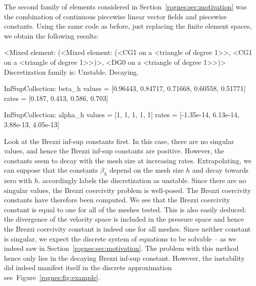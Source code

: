 The second family of elements considered in
Section~\ref{rognes:sec:motivation} was the combination of continuous
piecewise linear vector fields and piecewise constants. Using the same
code as before, just replacing the finite element spaces, we obtain
the following results:
\begin{python}
<Mixed element: (<Mixed element: (<CG1 on a <triangle of degree 1>>,
<CG1 on a <triangle of degree 1>>)>, <DG0 on a <triangle of degree 1>>)>
Discretization family is: Unstable. Decaying.

InfSupCollection: beta_h
values =         [0.96443, 0.84717, 0.71668, 0.60558, 0.51771]
rates  =         [0.187, 0.413, 0.586, 0.703]

InfSupCollection: alpha_h
values =         [1, 1, 1, 1, 1]
rates  =         [-1.35e-14, 6.13e-14, 3.88e-13, 4.05e-13]
\end{python}
Look at the Brezzi inf-sup constants first. In this case, there are no
singular values, and hence the Brezzi inf-sup constants are
positive. However, the constants seem to decay with the mesh size at
increasing rates. Extrapolating, we can suppose that the constants
$\beta_h$ depend on the mesh size $h$ and decay towards zero with
$h$. \rognesascot{} accordingly labels the discretization as
unstable. Since there are no singular values, the Brezzi coercivity
problem is well-posed. The Brezzi coercivity constants have therefore
been computed. We see that the Brezzi coercivity constant is equal to
one for all of the meshes tested. This is also easily deduced: the
divergence of the velocity space is included in the pressure space and
hence the Brezzi coercivity constant is indeed one for all
meshes. Since neither constant is singular, we expect the discrete
system of equations to be solvable -- as we indeed saw in
Section~\ref{rognes:sec:motivation}. The problem with this method
hence only lies in the decaying Brezzi inf-sup constant. However, the
instability did indeed manifest itself in the discrete approximation
see~Figure~\ref{rognes:fig:example}.

